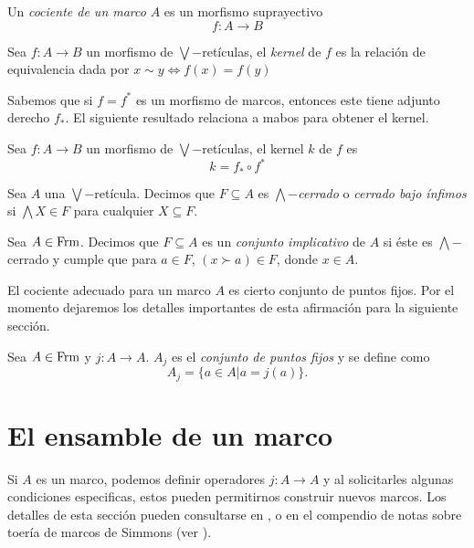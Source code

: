 \begin{dfn}\label{Cociente}
Un \emph{cociente de un marco} $A$ es un morfismo suprayectivo $$f:A\to B$$
\end{dfn}

\begin{dfn}
Sea $f:A\to B$ un morfismo de $\bigvee-$retículas, el \emph{kernel} de $f$ es la relación de equivalencia dada por $x\sim y\Leftrightarrow f(x)=f(y)$
\end{dfn}

Sabemos que si $f=f^*$ es un morfismo de marcos, entonces este tiene adjunto derecho $f_*$. El siguiente resultado relaciona a mabos para obtener el kernel. 
\begin{lem}
Sea $f:A\to B$ un morfismo de $\bigvee-$retículas, el kernel $k$ de $f$ es 
$$k=f_* \circ f^*$$
\end{lem}

\begin{dfn}
Sea $A$ una $\bigvee-$retícula. Decimos que $F\subseteq A$ es \emph{$\bigwedge-$cerrado} o \emph{cerrado bajo ínfimos} si $\bigwedge X\in F$ para cualquier $X\subseteq F$.
\end{dfn}

\begin{dfn}\label{Implicativo}
Sea $A\in \mathrm{Frm}$. Decimos que $F\subseteq A$ es un \emph{conjunto implicativo} de $A$ si éste es $\bigwedge-$cerrado y cumple que para $a\in F$, $(x\succ a)\in F$, donde $x\in A$.
\end{dfn}

El cociente adecuado para un marco $A$ es cierto conjunto de puntos fijos. Por el momento dejaremos los detalles importantes de esta afirmación para la 
siguiente sección. 

\begin{dfn}
Sea $A\in \mathrm{Frm}$ y $j\colon A\to A$. $A_j$ es el \emph{conjunto de puntos fijos} y se define como $$A_j=\{a\in A|a=j(a)\}.$$
\end{dfn}

\section{El ensamble de un marco}
Si $A$ es un marco, podemos definir operadores $j\colon A\to A$ y al solicitarles algunas condiciones especificas, estos pueden permitirnos construir nuevos marcos.
Los detalles de esta sección pueden consultarse en \cite{J.M.}, \cite{A.Z.} o en el compendio de notas sobre toería de marcos de Simmons (ver \cite{H.S.}).
